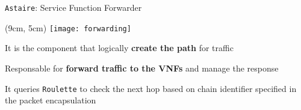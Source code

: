 \begin{frame}{\texttt{Astaire}: Service Function Forwarder}

  \begin{textblock*}{1cm}(9cm, 5cm)
    \texttt{[image: forwarding]}
  \end{textblock*}

  It is the component that logically \textbf{create the path} for traffic

  \vfill{}

  Responsable for \textbf{forward traffic to the VNFs} and manage the response

  \vfill{}

  It queries \texttt{Roulette} to check the next hop based on chain identifier
  specified in the packet encapsulation

\end{frame}